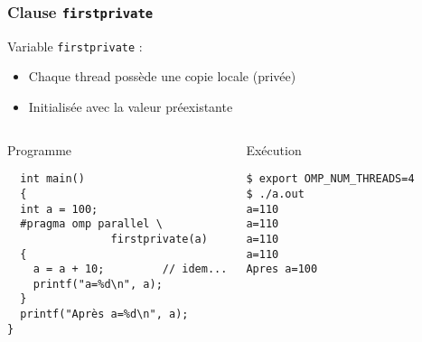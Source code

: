 \documentclass{beamer}
\begin{document}
\begin{frame}[fragile]
  \frametitle{Clause {\tt firstprivate}}
  
   Variable {\tt firstprivate} :
  \begin{itemize}
  \item Chaque thread possède une copie locale (privée)
  \item Initialisée avec la valeur préexistante
  \end{itemize}
  
  \begin{columns}[t]
  \column{5cm}
\begin{block}{Programme}
\begin{verbatim}
  int main()
  {
  int a = 100;
  #pragma omp parallel \
                firstprivate(a)
  {
    a = a + 10;         // idem...
    printf("a=%d\n", a);
  }
  printf("Après a=%d\n", a);
}
\end{verbatim}
\end{block}
    
    
    \column{5cm}
\begin{block}{Exécution}    
  \small
\begin{verbatim}
$ export OMP_NUM_THREADS=4
$ ./a.out 
a=110
a=110
a=110
a=110
Apres a=100
\end{verbatim}
\end{block}    
  \end{columns}
\normalsize

\end{frame}
\end{document}

